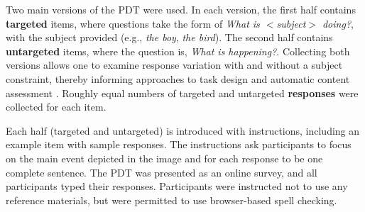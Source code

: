 \documentclass[11pt,a4paper]{article}
\begin{document}
Two main versions of the PDT were used. In each version, the first half contains \textbf{targeted} items, where questions take the form of \textit{What is $<$subject$>$ doing?}, with the subject provided (e.g., \textit{the boy}, \textit{the bird}). The second half contains \textbf{untargeted} items, where the question is, \textit{What is happening?}. Collecting both versions allows one to examine response variation with and without a subject constraint, thereby informing approaches to task design and automatic content assessment \citep{foster2009native, cho2013investigating}. Roughly equal numbers of targeted and untargeted \textbf{responses} were collected for each item.

Each half (targeted and untargeted) is introduced with instructions, including an example item with sample responses. The instructions ask participants to focus on the main event depicted in the image and for each response to be one complete sentence. The PDT was presented as an online survey, and all participants typed their responses. Participants were instructed not to use any reference materials, but were permitted to use browser-based spell checking.
\end{document}
